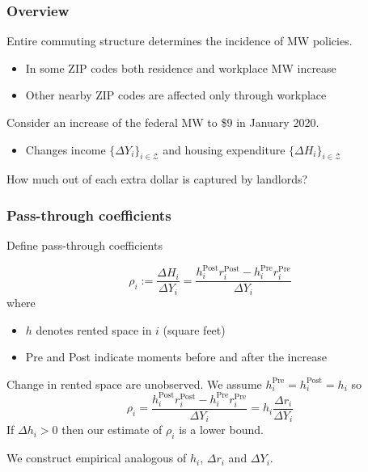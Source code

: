 \documentclass[aspectratio=169, t]{beamer}
\newcommand{\Z}{\mathcal{Z}}
\begin{document}
\begin{frame}
    \frametitle{Overview}
    
    Entire commuting structure determines the incidence of MW policies.
    \begin{itemize}
    	\vspace{1mm}
    	\item In some ZIP codes both residence and workplace MW increase
    	\vspace{1mm}
    	\item Other nearby ZIP codes are affected only through workplace
    \end{itemize}
    
    \pause
    \vspace{3mm}
    Consider an increase of the federal MW to \$9 in January 2020.
    \begin{itemize}
    	\vspace{1mm}
    	\item Changes income $\{\Delta Y_i\}_{i\in\Z}$ and housing expenditure $\{\Delta H_i\}_{i\in\Z}$
    \end{itemize}
    
    \pause
    \vspace{3mm}
    How much out of each extra dollar is captured by landlords?
   
\end{frame}

\begin{frame}
	\frametitle{Pass-through coefficients}
	Define pass-through coefficients
	
	\begin{equation*}
		\rho_i := \frac{\Delta H_i}{\Delta Y_i} =  \frac{h^{\text{Post}}_i r^{\text{Post}}_i - h^{\text{Pre}}_i r^{\text{Pre}}_i}{\Delta Y_i}
	\end{equation*}
	where 
	\begin{itemize}
		\item $h$ denotes rented space in $i$ (square feet)
		\item Pre and Post indicate moments before and after the increase
	\end{itemize}

	\pause
	\vspace{3mm}
	Change in rented space are unobserved. We assume $h^{\text{Pre}}_i = h^{\text{Post}}_i = h_i$ so
	\begin{equation*}
		\rho_i = \frac{h^{\text{Post}}_i r^{\text{Post}}_i - h^{\text{Pre}}_i r^{\text{Pre}}_i}{\Delta Y_i} = h_i \frac{\Delta r_i}{\Delta Y_i}
	\end{equation*}
	If $\Delta h_i > 0$ then our estimate of $\rho_i$ is a lower bound.

	\pause
	\vspace{2mm}
	We construct empirical analogous of $h_i$, $\Delta r_i$ and $\Delta Y_i$.

\end{frame}
\end{document}
